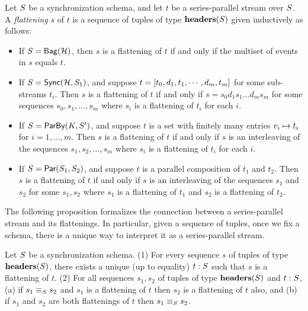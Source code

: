 \begin{definition}[Flattening]
    \label{45:def:sps-flattening}
    Let $\ss$ be a synchronization schema,
    and let $t$ be a series-parallel stream over $\ss$.
    A \emph{flattening} $s$ of $t$ is a sequence of tuples of type $\headers(\ss)$
    given inductively as follows:
\begin{itemize}
\item If $\ss = \relleaf{\mathcal{H}}$, then $s$ is a flattening of $t$ if and only if the multiset of events in $s$ equals $t$.
\item If $\ss = \hier{\mathcal{H}}{\ss_1}$, and suppose $t = \spsseq{t_0, d_1, t_1, \cdots, d_m, t_m}$ for some sub-streams
$t_i$.
Then $s$ is a flattening of $t$ if and only if $s = s_0 d_1 s_1 \ldots d_m s_m$ for some sequences $s_0, s_1, \ldots, s_m$ where $s_i$ is a flattening of $t_i$ for each $i$.
\item If $\ss = \keyby{K}{\ss'}$, and suppose $t$ is a set with finitely many entries $\keyed{v_i}{t_i}$ for $i = 1, \ldots, m$.
Then $s$ is a flattening of $t$ if and only if $s$ is an interleaving of the sequences $s_1, s_2, \ldots, s_m$
where $s_i$ is a flattening of $t_i$ for each $i$.
\item If $\ss = \parcomp{\ss_1}{\ss_2}$, and suppose $t$ is a parallel composition of $t_1$ and $t_2$.
Then $s$ is a flattening of $t$ if and only if $s$ is an interleaving of the sequences $s_1$ and $s_2$ for some $s_1, s_2$ where $s_1$ is a flattening of $t_1$ and $s_2$ is a flattening of $t_2$.
\end{itemize}
\end{definition}
The following proposition formalizes the connection between a series-parallel stream and its flattenings. In particular, given a sequence of tuples, once we fix a schema, there is a
unique way to interpret it as a series-parallel stream.

\begin{proposition}
\label{45:prop:sps-sequence-correspondence}
Let $\ss$ be a synchronization schema.
(1) For every sequence $s$ of tuples of type $\headers(\ss)$, there exists a unique (up to equality) $t : \ss$ such that $s$ is a flattening of $t$.
(2) For all sequences $s_1, s_2$ of tuples of type $\headers(\ss)$ and $t : \ss$,
(a) if $s_1 \equiv_{\ss} s_2$ and $s_1$ is a flattening of  $t$ then $s_2$ is a flattening of $t$ also, and
(b) if $s_1$ and $s_2$ are both flattenings of $t$ then $s_1 \equiv_{\ss} s_2$.
\end{proposition}

